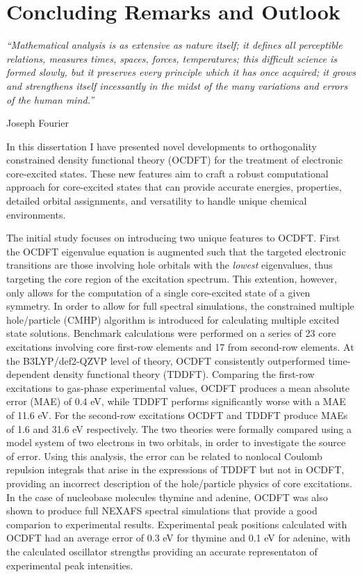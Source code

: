 \documentclass{article}
\begin{document}
\chapter{Concluding Remarks and Outlook}
\epigraph{\textit{``Mathematical analysis is as extensive as nature itself; it defines all perceptible relations, measures times, spaces, forces, temperatures; this difficult science is formed slowly, but it preserves every principle which it has once acquired; it grows and strengthens itself incessantly in the midst of the many variations and errors of the human mind.''}}{Joseph Fourier}
In this dissertation I have presented novel developments to orthogonality constrained density functional theory (OCDFT) for the treatment of electronic core-excited states. These new features aim to craft a robust computational approach for core-excited states that can provide accurate energies, properties, detailed orbital assignments, and versatility to handle unique chemical environments. 

The initial study focuses on introducing two unique features to OCDFT. First the OCDFT eigenvalue equation is augmented such that  the targeted electronic transitions are those involving hole orbitals with the \textit{lowest} eigenvalues, thus targeting the core region of the excitation spectrum. This extention, however, only allows for the computation of a single core-excited state of a given symmetry. In order to allow for full spectral simulations, the constrained multiple hole/particle (CMHP) algorithm is introduced for calculating multiple excited state solutions. Benchmark calculations were performed on a series of 23 core excitations involving core first-row elements and 17 from second-row elements. At the B3LYP/def2-QZVP level of theory, OCDFT consistently outperformed time-dependent density functional theory (TDDFT). Comparing the first-row excitations to gas-phase experimental values, OCDFT produces a mean absolute error (MAE) of 0.4 eV, while TDDFT performs significantly worse with a MAE of 11.6 eV. For the second-row excitations OCDFT and TDDFT produce MAEs of 1.6 and 31.6 eV respectively. The two theories were formally compared using a model system of two electrons in two orbitals, in order to investigate the source of error. Using this analysis, the error can be related to nonlocal Coulomb repulsion integrals that arise in the expressions of TDDFT but not in OCDFT, providing an incorrect description of the hole/particle physics of core excitations. In the case of nucleobase molecules thymine and adenine, OCDFT was also shown to produce full NEXAFS spectral simulations that provide a good comparion to experimental results.  Experimental peak positions calculated with OCDFT had an average error of  0.3 eV for thymine and 0.1 eV for adenine, with the calculated oscillator strengths providing an accurate representaton of experimental peak intensities.
\end{document}
